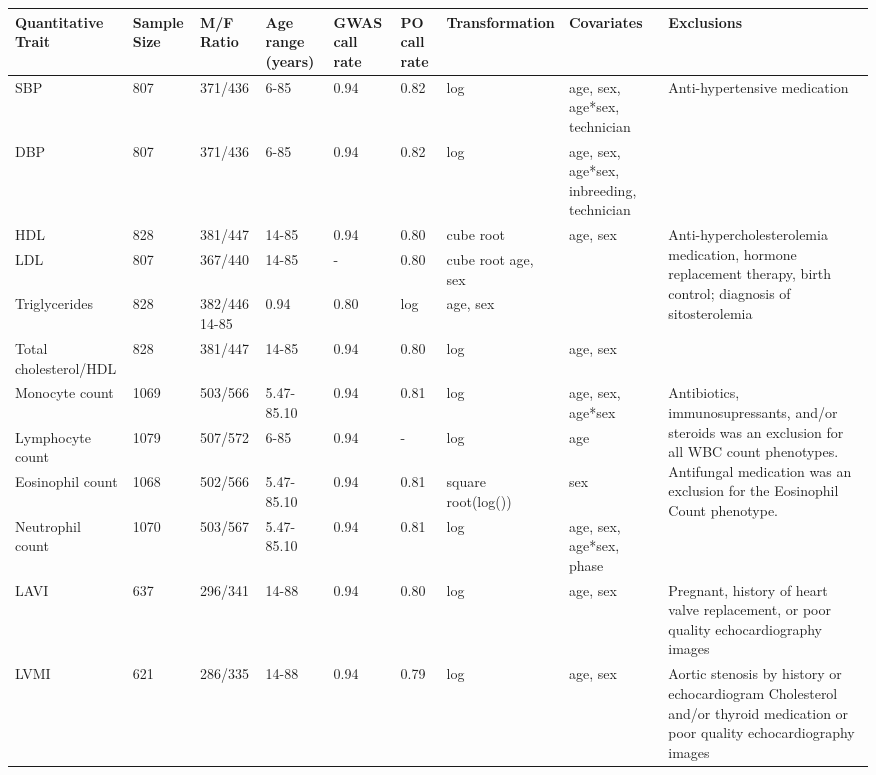 \begin{landscape}

\begin{table}
\centering
\begin{adjustbox}{width={\textwidth}}
\begin{tabular}{@{}p{2.5cm}|p{1cm}p{2cm}p{2cm}p{1cm}p{1cm}p{4cm}p{3cm}p{5cm}@{}}
\toprule Quantitative Trait & Sample Size & M/F Ratio & Age range (years) & GWAS call rate & PO call rate & Transformation & Covariates & Exclusions\\ \midrule
SBP & 807 & 	371/436 & 	6-85 & 	0.94 & 	0.82 & 	log & 	age, sex, age*sex, technician & \multirow{2}{5cm}{Anti-hypertensive medication} \\ \cline{1-8}
DBP & 807 & 	371/436 & 	6-85 & 	0.94 & 	0.82 & 	log & 	age, sex, age*sex, inbreeding, technician	 & \\ \hline
HDL & 828 & 	381/447 & 	14-85 & 	0.94 & 	0.80 & 	cube root & 	age, sex	& \multirow{4}{5cm}{Anti-hypercholesterolemia medication, hormone replacement therapy, birth control; diagnosis of sitosterolemia} \\ \cline{1-8}
LDL & 807 & 	367/440 & 	14-85 & 	- &	0.80 & 	cube root	age, sex	& \\ \cline{1-8}
Triglycerides & 828 & 382/446	14-85 & 	0.94	&0.80	&log	&age, sex	& \\ \cline{1-8}
Total cholesterol/HDL&	828 & 381/447&	14-85&	0.94&	0.80	&log	&age, sex	& \\ \hline
Monocyte count & 1069&	503/566&	5.47-85.10	&0.94&	0.81&	log&	age, sex, age*sex & \multirow{4}{5cm}{Antibiotics, immunosupressants, and/or steroids was an exclusion for all WBC count phenotypes. Antifungal medication was an exclusion for the Eosinophil Count phenotype.}\\ \cline{1-8}
Lymphocyte count & 1079 & 	507/572	&6-85 & 	0.94	 & - &	log	 & age	 & \\ \cline{1-8}
Eosinophil count & 1068 & 	502/566 & 	5.47-85.10	 & 0.94	 & 0.81	 & square root(log()) & 	sex	 & \\ \cline{1-8}
Neutrophil count & 1070 & 	503/567 & 	5.47-85.10 & 	0.94	 & 0.81	 & log	 & age, sex, age*sex, phase	 & \\ \cline{1-8}
LAVI & 637 & 	296/341 & 	14-88 & 	0.94 & 	0.80	 & log & 	age, sex & 	Pregnant, history of heart valve replacement, or poor quality echocardiography images \\ \hline
LVMI	 & 621 & 	286/335 & 	14-88 & 	0.94	 & 0.79 & 	log	 & age, sex	 & Aortic stenosis by history or echocardiogram Cholesterol and/or thyroid medication or poor quality echocardiography images \\ \hline

\end{tabular}
\end{adjustbox}
\end{table}
\end{landscape}
